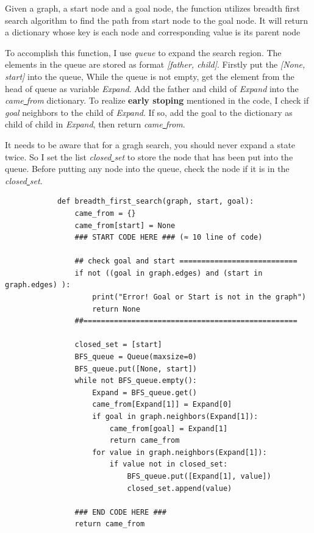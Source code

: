 \documentclass[aps,letterpaper,10pt]{revtex4}
\begin{document}
\begin{itemize}
\begin{itemize}
		Given a graph, a start node and a goal node, 
    	the function utilizes breadth first search algorithm to find the path from 
    	start node to the goal node. It will return a dictionary whose key is each node and corresponding  
		value is its parent node
		\vspace{3mm}

		To accomplish this function, I use \emph{queue} to expand the search region. The elements in the queue are stored as format \emph{[father, child]}.
		Firstly put the \emph{[None, start]} into the queue, While the queue is not empty, get the element from the head of queue as variable \emph{Expand}.
		Add the father and child of \emph{Expand} into the \emph{came\underline{ }from} dictionary. 
		To realize \textbf{early stoping} mentioned in the code, I check if \emph{goal} neighbors to the child of \emph{Expand}. If so, add the goal to the dictionary as
		child of child in \emph{Expand}, then return \emph{came\underline{ }from}.
		

		\vspace{3mm}
		It needs to be aware that for a gragh search, you should never expand a state twice. So I set the list \emph{closed\underline{ }set} to store the node that has been put into the queue.
		Before putting any node into the queue, check the node if it is in the \emph{closed\underline{ }set}.
		
		\begin{lstlisting}
			def breadth_first_search(graph, start, goal):
				came_from = {}
				came_from[start] = None
				### START CODE HERE ### (≈ 10 line of code)

				## check goal and start ===========================
				if not ((goal in graph.edges) and (start in graph.edges) ):
					print("Error! Goal or Start is not in the graph")
					return None
				##=================================================
				
				closed_set = [start]
				BFS_queue = Queue(maxsize=0)
				BFS_queue.put([None, start])
				while not BFS_queue.empty():
					Expand = BFS_queue.get()
					came_from[Expand[1]] = Expand[0]
					if goal in graph.neighbors(Expand[1]):
						came_from[goal] = Expand[1]
						return came_from
					for value in graph.neighbors(Expand[1]):
						if value not in closed_set:
							BFS_queue.put([Expand[1], value])
							closed_set.append(value)

				### END CODE HERE ###
    			return came_from
		\end{lstlisting}
		\vspace{3mm}


\end{itemize}
\end{itemize}
\end{document}
